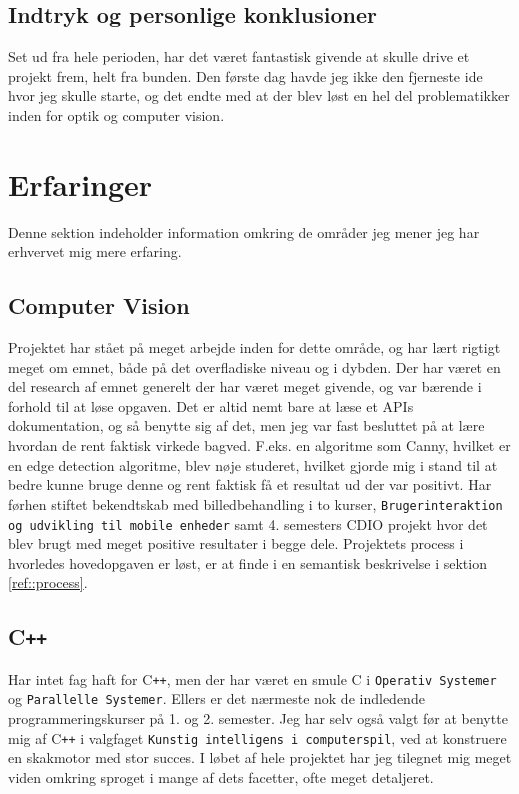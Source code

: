 \subsection{Indtryk og personlige konklusioner}
Set ud fra hele perioden, har det været fantastisk givende at skulle drive et projekt frem, helt fra bunden. Den første dag havde jeg ikke den fjerneste ide hvor jeg skulle starte, og det endte med at der blev løst en hel del problematikker inden for optik og computer vision.

\section{Erfaringer}
Denne sektion indeholder information omkring de områder jeg mener jeg har erhvervet mig mere erfaring.

\subsection{Computer Vision}
Projektet har stået på meget arbejde inden for dette område, og har lært rigtigt meget om emnet, både på det overfladiske niveau og i dybden. Der har været en del research af emnet generelt der har været meget givende, og var bærende i forhold til at løse opgaven. Det er altid nemt bare at læse et APIs dokumentation, og så benytte sig af det, men jeg var fast besluttet på at lære hvordan de rent faktisk virkede bagved. F.eks. en algoritme som Canny, hvilket er en edge detection algoritme, blev nøje studeret, hvilket gjorde mig i stand til at bedre kunne bruge denne og rent faktisk få et resultat ud der var positivt.
Har førhen stiftet bekendtskab med billedbehandling i to kurser, \texttt{Brugerinteraktion og udvikling til mobile enheder} samt 4. semesters CDIO projekt hvor det blev brugt med meget positive resultater i begge dele.
Projektets process i hvorledes hovedopgaven er løst, er at finde i en semantisk beskrivelse i sektion \ref{ref::process}.

\subsection{C\texttt{++}}
Har intet fag haft for C\texttt{++}, men der har været en smule C i \texttt{Operativ Systemer} og \texttt{Parallelle Systemer}. Ellers er det nærmeste nok de indledende programmeringskurser på 1. og 2. semester. Jeg har selv også valgt før at benytte mig af C\texttt{++} i valgfaget \texttt{Kunstig intelligens i computerspil}, ved at konstruere en skakmotor med stor succes.
I løbet af hele projektet har jeg tilegnet mig meget viden omkring sproget i mange af dets facetter, ofte meget detaljeret.
